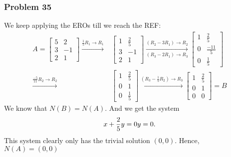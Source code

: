 \documentclass[a4paper,12pt]{article}
\begin{document}
\subsubsection*{Problem 35}
We keep applying the EROs till we reach the REF:
\begin{align*}
  A=\begin{bmatrix}
    5 & 2 \\
    3 & -1 \\
    2 & 1
  \end{bmatrix} \xrightarrow{{\frac{1}{5}R_1}\to{R_1}}&
  \begin{bmatrix}
    1 & \frac{2}{5} \\
    3 & -1 \\
    2 & 1
  \end{bmatrix} \xrightarrow[(R_3-2R_1)\to R_3]{(R_2-3R_1)\to R_2}
  \begin{bmatrix}
    1 & \frac{2}{5} \\
    0 & \frac{-11}{5}  \\
    0 & \frac{1}{5}
  \end{bmatrix}\\ \xrightarrow{{\frac{-5}{11}R_2}\to{R_2}}&
  \begin{bmatrix}
    1 & \frac{2}{5} \\
    0 & 1  \\
    0 & \frac{1}{5}
  \end{bmatrix} \xrightarrow{{(R_3-\frac{1}{5}R_2)}\to{R_3}}
  \begin{bmatrix}
    1 & \frac{2}{5} \\
    0 & 1  \\
    0 & 0
  \end{bmatrix} =B
\end{align*}
We know that $N(B)=N(A)$. And we get the system \[x+\frac{2}{5}y=0\\ y=0.\]
This system clearly only has the trivial solution $(0,0)$. Hence, $N(A)={(0,0)}$ 
\end{document}
